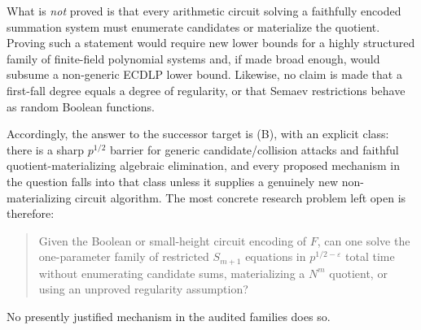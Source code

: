 \documentclass[11pt]{article}
\newcommand{\eps}{\varepsilon}
\begin{document}
What is \emph{not} proved is that every arithmetic circuit solving a faithfully %
encoded summation system must enumerate candidates or materialize the quotient.
Proving such a statement would require new lower bounds for a highly structured
family of finite-field polynomial systems and, if made broad enough, would
subsume a non-generic ECDLP lower bound.  Likewise, no claim is made that a
first-fall degree equals a degree of regularity, or that Semaev restrictions
behave as random Boolean functions.

Accordingly, the answer to the successor target is (B), with an explicit class:
there is a sharp $p^{1/2}$ barrier for generic candidate/collision attacks and
faithful quotient-materializing algebraic elimination, and every proposed
mechanism in the question falls into that class unless it supplies a genuinely
new non-materializing circuit algorithm.  The most concrete research problem
left open is therefore:
\begin{quote}
Given the Boolean or small-height circuit encoding of $F$, can one solve the
one-parameter family of restricted $S_{m+1}$ equations in
$p^{1/2-\eps}$ total time without enumerating candidate sums, materializing a
$N^m$ quotient, or using an unproved regularity assumption?
\end{quote}
No presently justified mechanism in the audited families does so.
\end{document}
